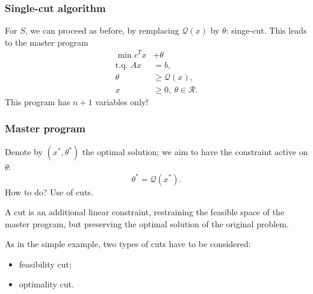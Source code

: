 \documentclass{beamer}
\def\rit{\mathcal{R}}
\begin{document}
\begin{frame}
\frametitle{Single-cut algorithm}
	
For $S$, we can proceed as before, by remplacing $\mathcal{Q}(x)$ by $\theta$: singe-cut.
This leads to the {\red master program}
\begin{align*}
	\min c^Tx & + \theta \\
	\mbox{t.q. } Ax & = b, \\
	\theta &\geq \mathcal{Q}(x),\\
	x & \geq 0,\ \theta \in \rit.
\end{align*}
This program has $n+1$ variables only!



\end{frame}

\begin{frame}
\frametitle{Master program}
	
Denote by $(x^*, \theta^*)$ the optimal solution; we aim to have the constraint active on $\theta$:
\[
\theta^* = \mathcal{Q}(x^*).
\]
How to do? Use of cuts.
	
\mbox{}

A cut is an additional linear constraint, restraining the feasible space of the master program, but preserving the optimal solution of the original problem.
	
\mbox{}
	
As in the simple example, two types of cuts have to be considered:
\begin{itemize}
\item
\mbox{\red feasibility} cut;
\item
\mbox{\red optimality} cut.
\end{itemize}
	
\end{frame}
\end{document}
